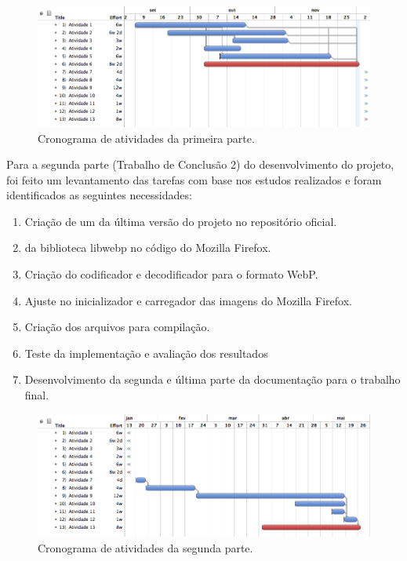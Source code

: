 \documentclass[espaco=simples,appendix=Name]{abnt}
\begin{document}
\begin{figure}[h]
  \centering
    \includegraphics[scale=0.5]{parte1.png}
  \caption{Cronograma de atividades da primeira parte.}
\end{figure}

Para a segunda parte (Trabalho de Conclusão 2) do desenvolvimento do projeto, foi feito um levantamento das tarefas com base nos estudos realizados e foram identificados as seguintes necessidades:
\begin{enumerate}
	\item Criação de um  da última versão do projeto no repositório oficial.
	\item {} da biblioteca libwebp no código do Mozilla Firefox.
	\item Criação do codificador e decodificador para o formato WebP.
	\item Ajuste no inicializador e carregador das imagens do Mozilla Firefox.
	\item Criação dos arquivos para compilação.
	\item Teste da implementação e avaliação dos resultados
	\item Desenvolvimento da segunda e última parte da documentação para o trabalho final.
\end{enumerate}

\begin{figure}[h]
  \centering
    \includegraphics[scale=0.5]{parte2.png}
  \caption{Cronograma de atividades da segunda parte.}
\end{figure}
\end{document}
